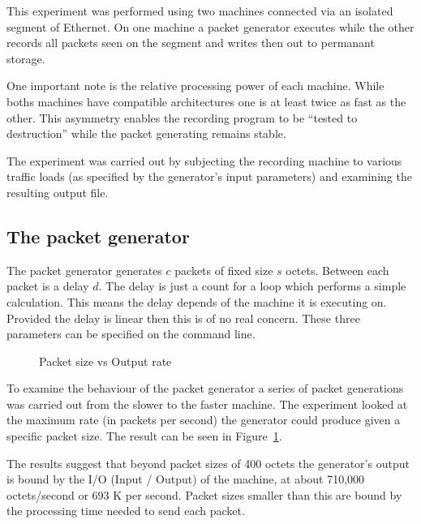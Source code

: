 This experiment was performed using two machines connected via an
isolated segment of Ethernet.  On one machine a packet generator
executes while the other records all packets seen on the segment and
writes then out to permanant storage.

One important note is the relative processing power of each machine.
While boths machines have compatible architectures one is at least
twice as fast as the other.  This asymmetry enables the recording
program to be ``tested to destruction'' while the packet generating
remains stable.

The experiment was carried out by subjecting the recording machine to
various traffic loads (as specified by the generator's input
parameters) and examining the resulting output file.

\subsection{The packet generator}

The packet generator generates $c$ packets of fixed size $s$ octets.
Between each packet is a delay $d$.  The delay is just a count for a
loop which performs a simple calculation.  This means the delay
depends of the machine it is executing on.  Provided the delay is
linear then this is of no real concern.  These three parameters can be
specified on the command line.

\begin{figure}
\leavevmode
{}
\caption{Packet size vs Output rate}
\label{Expr:fig1}
\end{figure}

To examine the behaviour of the packet generator a series of packet
generations was carried out from the slower to the faster machine.
The experiment looked at the maximum rate (in packets per second) the
generator could produce given a specific packet size.  The result can
be seen in Figure~\ref{Expr:fig1}.

The results suggest that beyond packet sizes of 400 octets the
generator's output is bound by the I/O (Input / Output) of the
machine, at about 710,000 octets/second or 693 K per second.  Packet
sizes smaller than this are bound by the processing time needed to
send each packet.


